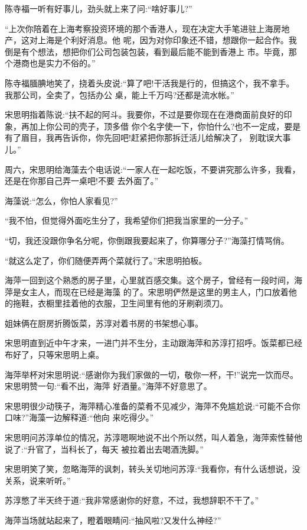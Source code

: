 \documentclass[11pt,a4paper,onecolumn]{article}
\begin{document}
陈寺福一听有好事儿，劲头就上来了问:``啥好事儿?''

``上次你陪着在上海考察投资环境的那个香港人，现在决定大手笔进驻上海房地产，这对上海是个利好消息。他
呢，因为对你印象还不错，想跟你一起合作。我倒是有个想法，想把你们公司包装包装，看到最后能不能到香港上
市。毕竟，那个港商也是实力不俗的。''

陈寺福腼腆地笑了，挠着头皮说:``算了吧!干活我是行的，但搞这个，我不拿手。我那公司，全卖了，包括办公
桌，能上千万吗?还都是流水帐。''

宋思明指着陈说:``扶不起的阿斗。我要你，不过是要你现在在港商面前良好的印象，再加上你公司的壳子，顶多借
你个名字使一下，你怕什么?也不一定成，要是有了眉目，我再告诉你，你先回吧!赶紧把你那拆迁活儿给解决了，
别耽误大事儿。''

周六，宋思明给海藻去个电话说:``一家人在一起吃饭，不要讲究那么许多，我看，还是在你那自己弄一桌吧!不要
去外面了。''

海藻说:``怎么，你怕人家看见?''

``我不怕，但觉得外面吃生分了，我希望你们把我当家里的一分子。''

``切，我还没跟你争名分呢，你倒跟我要起来了，你算哪分子?''海藻打情骂俏。

``就这么定了，你们随便弄两个菜就行了。''宋思明拍板。

海萍一回到这个熟悉的房子里，心里就百感交集。这个房子，曾经有一段时间，海萍是女主人，而现在已经是海藻
的了。宋思明俨然是这里的男主人，门口放着他的拖鞋，衣橱里挂着他的衣服，卫生间里有他的牙刷剃须刀。

姐妹俩在厨房折腾饭菜，苏淳对着书房的书架想心事。

宋思明直到近中午才来，一进门并不生分，主动跟海萍和苏淳打招呼。饭菜都已经布好了，只等宋思明上桌。

海萍举杯对宋思明说:``感谢你为我们家做的一切，敬你一杯，干!''说完一饮而尽。宋思明赞一句:``看不出，海萍
好酒量。''海萍不好意思了。

宋思明很少动筷子，海萍精心准备的菜肴不见减少，海萍不免尴尬说:``可能不合你口味?''海藻一边解释道:``他向
来吃得少。''

宋思明问苏淳单位的情况，苏淳嗯啊地说不出个所以然，叫人着急，海萍索性替他说了:``升官了，当科长了，每天
被拉着出去喝酒洗脚。''

宋思明笑了笑，忽略海萍的讽刺，转头关切地问苏淳:``我看你，有什么话想说，没关系，说来听听。''

苏淳憋了半天终于道:``我非常感谢你的好意，不过，我想辞职不干了。''

海萍当场就站起来了，瞪着眼睛问:``抽风啦?又发什么神经?''
\end{document}
